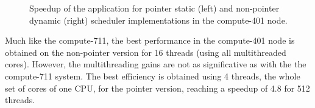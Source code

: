 \begin{figure}[!htp]
	\begin{center}
		\caption{Speedup of the \tth application for pointer static (left) and non-pointer dynamic (right) scheduler implementations in the compute-401 node.}
		\label{fig:Speedup401}
	\end{center}
\end{figure}

Much like the compute-711, the best performance in the compute-401 node is obtained on the non-pointer version for 16 threads (using all multithreaded cores). However, the multithreading gains are not as significative as with the the compute-711 system. The best efficiency is obtained using 4 threads, the whole set of cores of one CPU, for the pointer version, reaching a speedup of 4.8 for 512 threads.

